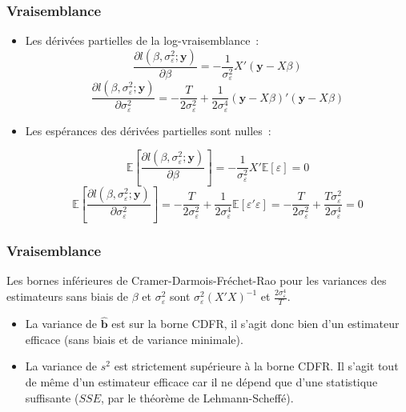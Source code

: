 \documentclass[10pt]{beamer}
\begin{document}
\begin{frame}
  \frametitle{Vraisemblance}

  \begin{itemize}

  \item Les dérivées partielles de la log-vraisemblance~:
    \[
      \frac{\partial l(\beta, \sigma_{\varepsilon}^2; \mathbf y)}{\partial\beta} = -\frac{1}{\sigma_{\varepsilon}^2}X'(\mathbf y - X\beta)
    \]
    \[
      \frac{\partial l(\beta, \sigma_{\varepsilon}^2; \mathbf y)}{\partial\sigma_{\varepsilon}^2} = -\frac{T}{2\sigma_{\varepsilon}^2} + \frac{1}{2\sigma_{\varepsilon}^4}\left( \mathbf y - X\beta \right)'\left( \mathbf y - X\beta \right)
    \]
    \medskip

  \item Les espérances des dérivées partielles sont nulles~:

    \[
      \mathbb E\left[ \frac{\partial l(\beta, \sigma_{\varepsilon}^2; \mathbf y)}{\partial\beta} \right] = -\frac{1}{\sigma_{\varepsilon}^2}X'\mathbb E[\varepsilon] = 0
    \]
    \[
      \mathbb E \left[ \frac{\partial l(\beta, \sigma_{\varepsilon}^2; \mathbf y)}{\partial\sigma_{\varepsilon}^2} \right] = -\frac{T}{2\sigma_{\varepsilon}^2} + \frac{1}{2\sigma_{\varepsilon}^4}\mathbb E[\varepsilon'\varepsilon] = -\frac{T}{2\sigma_{\varepsilon}^2} + \frac{T\sigma_{\varepsilon}^2}{2\sigma_{\varepsilon}^4} = 0
    \]

  \end{itemize}

\end{frame}


\begin{frame}
  \frametitle{Vraisemblance}

  \begin{prop}\label{prop:cdfr}
    Les bornes inférieures de Cramer-Darmois-Fréchet-Rao pour les variances des estimateurs sans biais de $\beta$ et $\sigma_{\varepsilon}^2$ sont $\sigma_{\varepsilon}^2(X'X)^{-1}$ et $\frac{2\sigma_{\varepsilon}^4}{T}$.
  \end{prop}

  \bigskip

  \begin{itemize}

  \item La variance de $\hat{\mathbf b}$ est sur la borne CDFR, il s'agit donc bien d'un estimateur efficace (sans biais et de variance minimale).\newline

  \item La variance de $s^2$ est strictement supérieure à la borne CDFR. Il s'agit tout de même d'un estimateur efficace car il ne dépend que d'une statistique suffisante ($SSE$, par le théorème de Lehmann-Scheffé).

  \end{itemize}

\end{frame}
\end{document}
